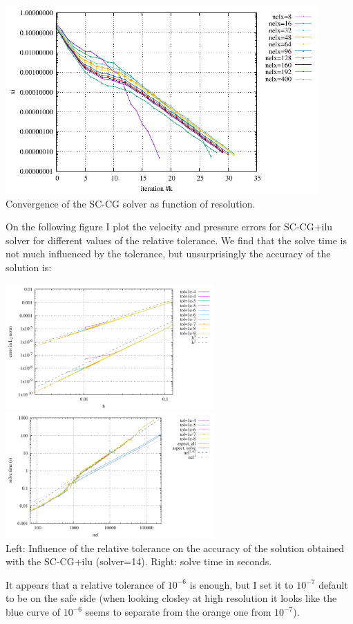 \begin{center}
\includegraphics[width=12cm]{python_codes/fieldstone_147/RESULTS/convergence_schur_cpl.pdf}\\
{\captionfont Convergence of the SC-CG solver as function of resolution.}
\end{center}

On the following figure I plot the velocity and pressure errors for SC-CG+ilu solver 
for different values of the relative tolerance. We find that the solve time is not 
much influenced by the tolerance, but unsurprisingly the accuracy of the solution is: 
\begin{center}
\includegraphics[width=8cm]{python_codes/fieldstone_147/RESULTS/tol_study_solver14/errors.pdf}
\includegraphics[width=8cm]{python_codes/fieldstone_147/RESULTS/tol_study_solver14/solve.pdf}\\
{\captionfont Left: Influence of the relative tolerance on the accuracy of the solution obtained 
with the SC-CG+ilu ({\python solver=14}). Right: solve time in seconds.}
\end{center}
It appears that a relative tolerance of $10^{-6}$ is enough, but I set it to $10^{-7}$ default
to be on the safe side (when looking closley at high resolution it looks like the 
blue curve of $10^{-6}$  seems to separate from the orange one from $10^{-7}$).

